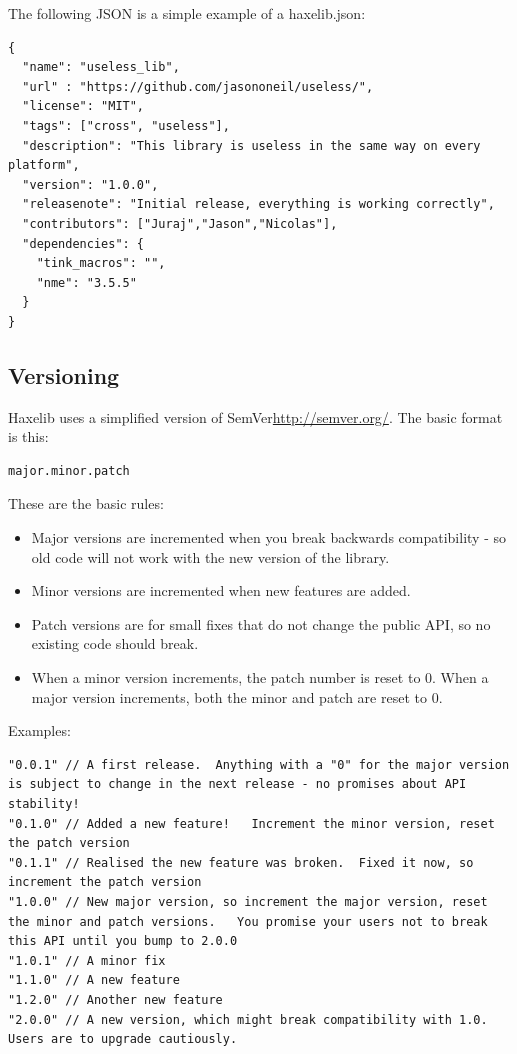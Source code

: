 \documentclass{haxe}
\begin{document}
The following JSON is a simple example of a haxelib.json:

\begin{lstlisting}
{
  "name": "useless_lib",
  "url" : "https://github.com/jasononeil/useless/",
  "license": "MIT",
  "tags": ["cross", "useless"],
  "description": "This library is useless in the same way on every platform",
  "version": "1.0.0",
  "releasenote": "Initial release, everything is working correctly",
  "contributors": ["Juraj","Jason","Nicolas"],
  "dependencies": {
    "tink_macros": "",
    "nme": "3.5.5"
  }
}
\end{lstlisting}



\subsection{Versioning}
\label{haxelib-json-versioning}

Haxelib uses a simplified version of SemVer\url{http://semver.org/}. The basic format is this:

\begin{lstlisting}
major.minor.patch
\end{lstlisting}

These are the basic rules:

\begin{itemize}
	\item Major versions are incremented when you break backwards compatibility - so old code will not work with the new version of the library.
	\item Minor versions are incremented when new features are added.
	\item Patch versions are for small fixes that do not change the public API, so no existing code should break.
	\item When a minor version increments, the patch number is reset to 0. When a major version increments, both the minor and patch are reset to 0.
\end{itemize}

Examples:

\begin{lstlisting}
"0.0.1" // A first release.  Anything with a "0" for the major version is subject to change in the next release - no promises about API stability!
"0.1.0" // Added a new feature!   Increment the minor version, reset the patch version
"0.1.1" // Realised the new feature was broken.  Fixed it now, so increment the patch version
"1.0.0" // New major version, so increment the major version, reset the minor and patch versions.   You promise your users not to break this API until you bump to 2.0.0
"1.0.1" // A minor fix
"1.1.0" // A new feature
"1.2.0" // Another new feature
"2.0.0" // A new version, which might break compatibility with 1.0.  Users are to upgrade cautiously.
\end{lstlisting}
\end{document}

